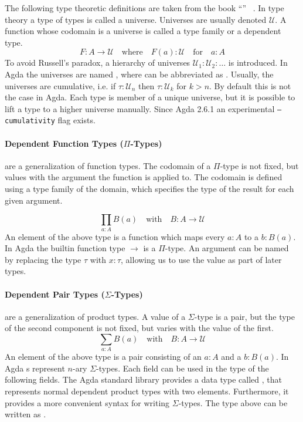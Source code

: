 The following type theoretic definitions are taken from the
book ``'' ~\cite{hottbook}.
In type theory a type of types is called a universe.
Universes are usually denoted $\mathcal{U}$.
A function whose codomain is a universe is called a type family or a dependent
type.
$$
F : A \rightarrow \mathcal{U} \quad\text{where}\quad F(a) : \mathcal{U}
\quad\text{for}\quad a : A
$$
To avoid Russell's paradox, a hierarchy of universes $\mathcal{U}_1 :
\mathcal{U}_2 : \dots$ is introduced.
In Agda the universes are named , where 
can be abbreviated as .
Usually, the universes are cumulative, i.e. if $\tau : \mathcal{U}_n$ then
$\tau : \mathcal{U}_k$ for $k>n$.
By default this is not the case in Agda.
Each type is member of a unique universe, but it is possible to lift a type to a
higher universe manually.
Since Agda 2.6.1 an experimental \texttt{--cumulativity} flag exists.

\paragraph{Dependent Function Types ($\Pi$-Types)} are a generalization of
function types.
The codomain of a $\Pi$-type is not fixed, but values with the argument the
function is applied to.
The codomain is defined using a type family of the domain, which specifies the
type of the result for each given argument.

$$
\prod_{a : A} B(a) \quad \text{with}\quad B : A \rightarrow\mathcal{U}
$$
An element of the above type is a function which maps every $a : A$ to a $b :
B(a)$.
In Agda the builtin function type $\rightarrow$ is a $\Pi$-type.
An argument can be named by replacing the type $\tau$ with $x : \tau$, allowing
us to use the value as part of later types.

\paragraph{Dependent Pair Types ($\Sigma$-Types)} are a generalization of product
types.
A value of a $\Sigma$-type is a pair, but the type of the second component is
not fixed, but varies with the value of the first.
$$
\sum_{a : A} B(a) \quad \text{with}\quad B : A \rightarrow\mathcal{U}
$$
An element of the above type is a pair consisting of an $a : A$ and a $b : B(a)$.
In Agda s represent $n$-ary $\Sigma$-types.
Each field can be used in the type of the following fields.
The Agda standard library provides a data type called , that
represents normal dependent product types with two elements.
Furthermore, it provides a more convenient syntax for writing $\Sigma$-types.
The type above can be written as .


